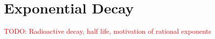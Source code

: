 \section*{Exponential Decay}
\textcolor{red}{TODO: Radioactive decay, half life, motivation of rational exponents}